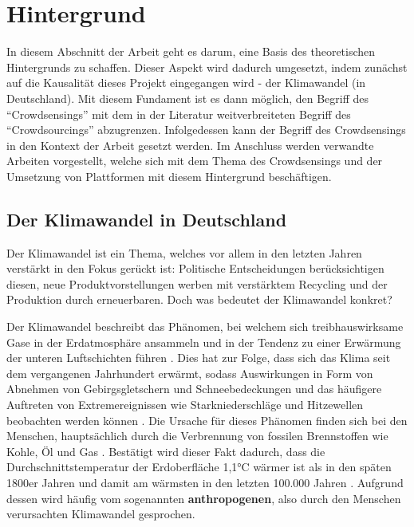 \chapter{Hintergrund} %
In diesem Abschnitt der Arbeit geht es darum, eine Basis des theoretischen Hintergrunds zu schaffen. Dieser Aspekt wird dadurch umgesetzt, indem zunächst auf die Kausalität dieses Projekt eingegangen wird - der Klimawandel (in Deutschland). Mit diesem Fundament ist es dann möglich, den Begriff des \enquote{Crowdsensings} mit dem in der Literatur weitverbreiteten Begriff des \enquote{Crowdsourcings} abzugrenzen. Infolgedessen kann der Begriff des Crowdsensings in den Kontext der Arbeit gesetzt werden.  Im Anschluss werden verwandte Arbeiten vorgestellt, welche sich mit dem Thema des Crowdsensings und der Umsetzung von Plattformen mit diesem Hintergrund beschäftigen.

\section{Der Klimawandel in Deutschland}
Der Klimawandel ist ein Thema, welches vor allem in den letzten Jahren verstärkt in den Fokus gerückt ist: Politische Entscheidungen berücksichtigen diesen, neue Produktvorstellungen werben mit verstärktem Recycling und der Produktion durch erneuerbaren. Doch was bedeutet der Klimawandel konkret? 

Der Klimawandel beschreibt das Phänomen, bei welchem sich treibhauswirksame Gase in der Erdatmosphäre ansammeln und in der Tendenz zu einer Erwärmung der unteren Luftschichten führen \cite{UmweltbundesamtKlimawandel}. Dies hat zur Folge, dass sich das Klima seit dem vergangenen Jahrhundert erwärmt, sodass Auswirkungen in Form von Abnehmen von Gebirgsgletschern und Schneebedeckungen und das häufigere Auftreten von Extremereignissen wie Starkniederschläge und Hitzewellen beobachten werden können \cite{UmweltbundesamtKlimawandel}. Die Ursache für dieses Phänomen finden sich bei den Menschen, hauptsächlich durch die Verbrennung von fossilen Brennstoffen wie Kohle, Öl und Gas \cite{UnitedNationsClimateChange}. Bestätigt wird dieser Fakt dadurch, dass die Durchschnittstemperatur der Erdoberfläche 1,1°C wärmer ist als in den späten 1800er Jahren und damit am wärmsten in den letzten 100.000 Jahren \cite{UnitedNationsClimateChange}. Aufgrund dessen wird häufig vom sogenannten \textbf{anthropogenen}, also durch den Menschen verursachten Klimawandel gesprochen.

